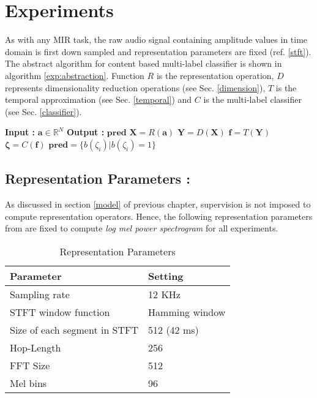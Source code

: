 \section{Experiments}
\label{experiments}
 
As with any MIR task, the raw audio signal containing amplitude values in time domain is first down sampled and representation parameters are fixed (ref. \ref{stft}). The abstract algorithm for content based multi-label classifier is shown in algorithm \ref{exp:abstraction}. Function $R$ is the representation operation, $D$ represents dimensionality reduction operations (see Sec. \ref{dimension}), $T$ is the temporal approximation (see Sec. \ref{temporal}) and $C$ is the multi-label classifier (see Sec. \ref{classifier}). 
 
\begin{algorithm}
  \caption{$\textbf{pred}$ = $Model$($\textbf{a}$) }\label{exp:abstraction}
  \begin{algorithmic}[1]
    \Statex \textbf{Input :} $\textbf{a} \in \mathbb{R}^{N}$
    \Statex \textbf{Output :} $\textbf{pred}$ 
    \State $\textbf{X} = R(\textbf{a})$ 
    \State $\textbf{Y} = D(\textbf{X})$ 
    \State $\textbf{f} = T(\textbf{Y})$ 
    \State $\bm{\zeta} = C(\textbf{f})$ 
    \State $\textbf{pred} = \{ b(\zeta_{i}) | b(\zeta_{i}) = 1 \}$ 
  \end{algorithmic}
\end{algorithm}
\FloatBarrier

\subsection{Representation Parameters :}
\label{repPara}
As discussed in section \ref{model} of previous chapter, supervision is not imposed to compute representation operators. Hence, the following  representation parameters from \cite{choi_cnn} are fixed to compute \textit{log mel power spectrogram} for all experiments. 

\begin{table}[!htb]
\centering
\begin{tabular}{| p{} | p{}|}
\hline
\textbf{Parameter} & \textbf{Setting}\\
\hline
Sampling rate & 12 KHz\\
\hline
STFT window function & Hamming window\\
\hline
Size of each segment in STFT & 512 (42 ms)\\
\hline
Hop-Length & 256\\
\hline
FFT Size & 512\\
\hline
Mel bins & 96\\
\hline
\end{tabular}
\caption{Representation Parameters}\label{tab:repPara} 
\end{table}
\FloatBarrier

